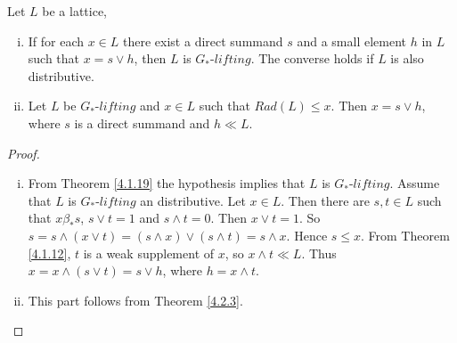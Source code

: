 \documentclass[handout]{beamer}
\begin{document}
\begin{frame}
\fontsize{10pt}{7.5}\selectfont
\begin{corollary} \label{4.2.4}
    Let $ L $ be a lattice,
    \begin{enumerate}[(i)]
        \item 
            If for each $ x \in L $ there exist a direct summand $ s $ and a small element $ h $ in $ L $ 
            such that $ x = s \vee h $, then $ L $ is $ G_* $-$ lifting $. The converse holds if $ L $ is also distributive.
        \item
            Let $ L $ be $ G_* $-$ lifting $ and $ x \in L $ such that $ Rad(L) \leq x $. Then $ x = s \vee h $, where 
            $ s $ is a direct summand and $ h \ll L $. 
      \end{enumerate}
\end{corollary}
\begingroup
{}
\begin{proof}
    \begin{enumerate}[(i)]
        \item 
            From Theorem \ref{4.1.19} the hypothesis implies that $ L $ is $ G_* $-$ lifting $. 
            Assume that $ L $ is $ G_* $-$ lifting $ an distributive. Let $ x \in L $. 
            Then there are $ s,t \in L $ such that $ x \beta_* s $, $ s \vee t = 1 $ and $ s \wedge t = 0 $. 
            Then $ x \vee t = 1 $. So $ s = s \wedge (x \vee t) = (s \wedge x) \vee (s \wedge t) = s \wedge x $. 
            Hence $ s \leq x $. From Theorem \ref{4.1.12}, $ t $ is a weak supplement of $ x $, so $ x \wedge t \ll L $. 
            Thus $ x = x \wedge (s \vee t) = s \vee h $, where $ h = x \wedge t $.
        \item
            This part follows from Theorem \ref{4.2.3}.
    \end{enumerate}
\end{proof}
\endgroup
\end{frame}
\end{document}
